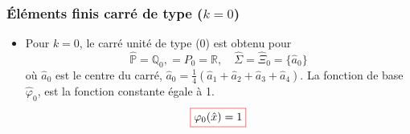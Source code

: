 \documentclass{beamer}
\newcommand{\myredbox}[1]{\fcolorbox{red}{white}{$\displaystyle#1$}}
\begin{document}
\begin{frame}
\frametitle{Éléments finis carré de type ($k=0$)}
 \begin{center}
   \end{center}

\begin{itemize}
\item Pour $k=0$, le carré unité de type (0) est obtenu pour
\[\widehat{\mathbb{P}} = \mathbb{Q}_0, = P_0=\mathbb{R} ,\quad \widehat{\Sigma} =\widehat{\Xi}_0=\{\hat{a}_0\}\]
où $\hat{a}_0$ est le centre du carré, $\hat{a}_0=\frac 14(\hat{a}_1+\hat{a}_2+\hat{a}_3+\hat{a}_4)$. La fonction de base $\widehat{\varphi}_0$, est la fonction constante égale à 1.
\[\myredbox{\varphi_0(\hat{x})=1}\]
\end{itemize}
\end{frame}
\end{document}
